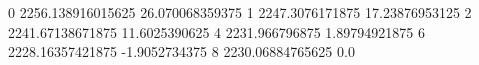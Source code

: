 0 2256.138916015625 26.070068359375
1 2247.3076171875 17.23876953125
2 2241.67138671875 11.6025390625
4 2231.966796875 1.89794921875
6 2228.16357421875 -1.9052734375
8 2230.06884765625 0.0
